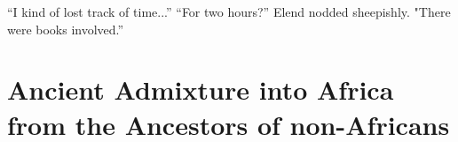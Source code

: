 \begin{savequote}[10cm]

  ``I kind of lost track of time...''\newline
  ``For two hours?''\newline
  Elend nodded sheepishly. "There were books involved.”
  
\end{savequote}

\chapter{Ancient Admixture into Africa from the Ancestors of non-Africans} \label{ch:aaa}









